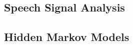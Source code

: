 \documentclass[9pt]{extarticle}
\begin{document}
  \begin{multicols}{2}
  \subsection*{Speech Signal Analysis}
  
  \subsection*{Hidden Markov Models}
  
  \end{multicols}
\end{document}
